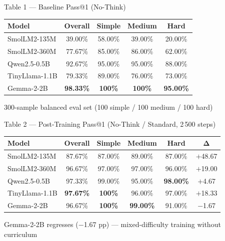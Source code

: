 \documentclass[10pt, aspectratio=169]{beamer}
\begin{document}
\begin{frame}{Table 1 — Baseline Pass@1 (No-Think)}
  \centering
  \footnotesize
  \renewcommand{\arraystretch}{1.55}
  \setlength\tabcolsep{10pt}
  \begin{tabular}{@{}lcccc@{}}
    \toprule
    \textbf{Model} & \textbf{Overall} & \textbf{Simple} & \textbf{Medium} & \textbf{Hard} \\
    \midrule
    SmolLM2-135M   & 39.00\% & 58.00\% & 39.00\% & 20.00\% \\
    SmolLM2-360M   & 77.67\% & 85.00\% & 86.00\% & 62.00\% \\
    Qwen2.5-0.5B   & 92.67\% & 95.00\% & 95.00\% & 88.00\% \\
    TinyLlama-1.1B & 79.33\% & 89.00\% & 76.00\% & 73.00\% \\
    Gemma-2-2B     & \textbf{98.33\%} & \textbf{100\%} & \textbf{100\%} & \textbf{95.00\%} \\
    \bottomrule
  \end{tabular}
  \vspace{0.6em}

  \small 300-sample balanced eval set (100 simple / 100 medium / 100 hard)
\end{frame}

\begin{frame}{Table 2 — Post-Training Pass@1 (No-Think / Standard, 2\,500 steps)}
  \centering
  \footnotesize
  \renewcommand{\arraystretch}{1.55}
  \setlength\tabcolsep{7pt}
  \begin{tabular}{@{}lccccc@{}}
    \toprule
    \textbf{Model} & \textbf{Overall} & \textbf{Simple} & \textbf{Medium} & \textbf{Hard} & $\boldsymbol{\Delta}$ \\
    \midrule
    SmolLM2-135M   & 87.67\% & 87.00\% & 89.00\% & 87.00\% & \alert{$+$48.67} \\
    SmolLM2-360M   & 96.67\% & 97.00\% & 97.00\% & 96.00\% & $+$19.00 \\
    Qwen2.5-0.5B   & 97.33\% & 99.00\% & 95.00\% & \textbf{98.00\%} & $+$4.67  \\
    TinyLlama-1.1B & \textbf{97.67\%} & \textbf{100\%} & 96.00\% & 97.00\% & $+$18.33 \\
    Gemma-2-2B     & 96.67\% & \textbf{100\%} & \textbf{99.00\%} & 91.00\% & \alert{$-$1.67} \\
    \bottomrule
  \end{tabular}
  \vspace{0.5em}

  \small Gemma-2-2B regresses ($-$1.67 pp) — mixed-difficulty training without curriculum
\end{frame}
\end{document}
